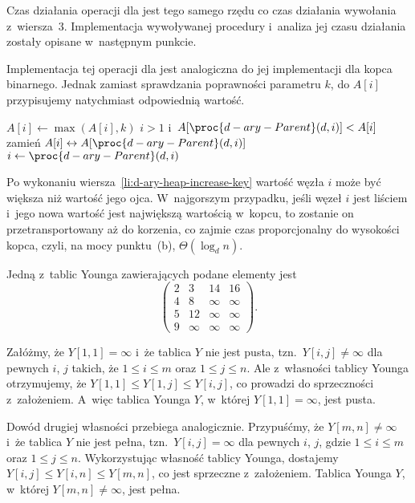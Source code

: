 Czas działania operacji  dla  jest tego samego rzędu co czas działania wywołania z~wiersza~3. Implementacja wywoływanej procedury  i~analiza jej czasu działania zostały opisane w~następnym punkcie.

\subproblem %
Implementacja tej operacji dla  jest analogiczna do jej implementacji dla kopca binarnego. Jednak zamiast sprawdzania poprawności parametru $k$, do $A[i]$ przypisujemy natychmiast odpowiednią wartość.
\begin{codebox}
\li	$A[i]\gets\max(A[i],k)$ \label{li:d-ary-heap-increase-key}
\li	\While $i>1$ i~$A[\proc{d-ary-Parent}(d,i)]<A[i]$
\li		\Do
			zamień $A[i]\leftrightarrow A[\proc{d-ary-Parent}(d,i)]$
\li			$i\gets\proc{d-ary-Parent}(d,i)$
		\End
\end{codebox}

Po wykonaniu wiersza~\ref{li:d-ary-heap-increase-key} wartość węzła $i$ może być większa niż wartość jego ojca. W~najgorszym przypadku, jeśli węzeł $i$ jest liściem i~jego nowa wartość jest największą wartością w~kopcu, to zostanie on przetransportowany aż do korzenia, co zajmie czas proporcjonalny do wysokości kopca, czyli, na mocy punktu~(b), $\Theta(\log_dn)$.


\subproblem %
Jedną z~tablic Younga zawierających podane elementy jest
\[
	\begin{pmatrix}
		2 & 3 & 14 & 16 \\
		4 & 8 & \infty & \infty \\
		5 & 12 & \infty & \infty \\
		9 & \infty& \infty & \infty
	\end{pmatrix}.
\]

\subproblem %
Załóżmy, że $Y[1,1]=\infty$ i~że tablica $Y$ nie jest pusta, tzn.\ $Y[i,j]\ne\infty$ dla pewnych $i$, $j$ takich, że $1\le i\le m$ oraz $1\le j\le n$. Ale z~własności tablicy Younga otrzymujemy, że $Y[1,1]\le Y[1,j]\le Y[i,j]$, co prowadzi do sprzeczności z~założeniem. A~więc tablica Younga $Y$, w~której $Y[1,1]=\infty$, jest pusta.

Dowód drugiej własności przebiega analogicznie. Przypuśćmy, że $Y[m,n]\ne\infty$ i~że tablica $Y$ nie jest pełna, tzn.\ $Y[i,j]=\infty$ dla pewnych $i$, $j$, gdzie $1\le i\le m$ oraz $1\le j\le n$. Wykorzystując własność tablicy Younga, dostajemy $Y[i,j]\le Y[i,n]\le Y[m,n]$, co jest sprzeczne z~założeniem. Tablica Younga $Y$, w~której $Y[m,n]\ne\infty$, jest pełna.

